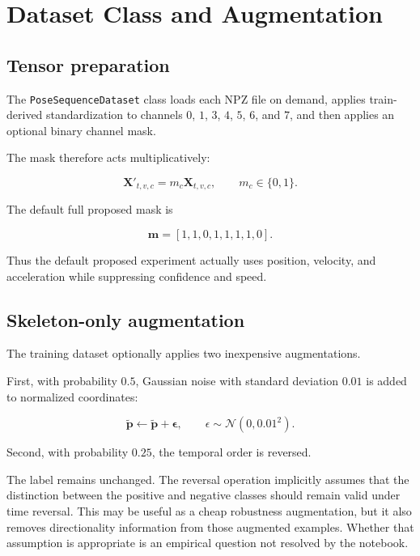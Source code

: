 \documentclass[11pt,a4paper]{article}
\newcommand{\code}[1]{\texttt{#1}}
\begin{document}
\section{Dataset Class and Augmentation}

\subsection{Tensor preparation}

The \code{PoseSequenceDataset} class loads each NPZ file on demand, applies train-derived standardization to channels $0$, $1$, $3$, $4$, $5$, $6$, and $7$, and then applies an optional binary channel mask.

The mask therefore acts multiplicatively:

\begin{equation}
\mathbf{X}'_{t,v,c}
=
m_c \mathbf{X}_{t,v,c},
\qquad
m_c\in\{0,1\}.
\end{equation}

The default full proposed mask is

\begin{equation}
\mathbf{m}
=
[1,1,0,1,1,1,1,0].
\end{equation}

Thus the default proposed experiment actually uses position, velocity, and acceleration while suppressing confidence and speed.

\subsection{Skeleton-only augmentation}

The training dataset optionally applies two inexpensive augmentations.

First, with probability $0.5$, Gaussian noise with standard deviation $0.01$ is added to normalized coordinates:

\begin{equation}
\widetilde{\mathbf{p}}
\leftarrow
\widetilde{\mathbf{p}}
+
\boldsymbol{\epsilon},
\qquad
\epsilon\sim\mathcal{N}(0,0.01^2).
\end{equation}

Second, with probability $0.25$, the temporal order is reversed.

The label remains unchanged. The reversal operation implicitly assumes that the distinction between the positive and negative classes should remain valid under time reversal. This may be useful as a cheap robustness augmentation, but it also removes directionality information from those augmented examples. Whether that assumption is appropriate is an empirical question not resolved by the notebook.
\end{document}
